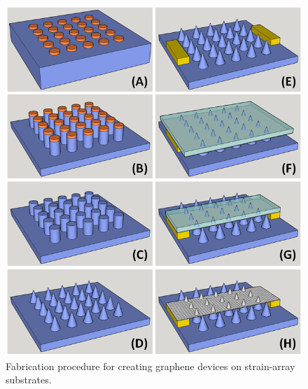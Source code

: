\documentclass[%
 aip,
 apl,%
 amsmath,amssymb,
 reprint,%
]{revtex4-1}
\begin{document}
\begin{figure}
\centering
\includegraphics[width=\columnwidth]{Figure1}
\caption{Fabrication procedure for creating graphene devices on strain-array substrates.}
\label{'fig:fab'}
\end{figure}
\end{document}
